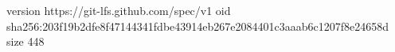 version https://git-lfs.github.com/spec/v1
oid sha256:203f19b2dfe8f47144341fdbe43914eb267e2084401c3aaab6c1207f8e24658d
size 448
